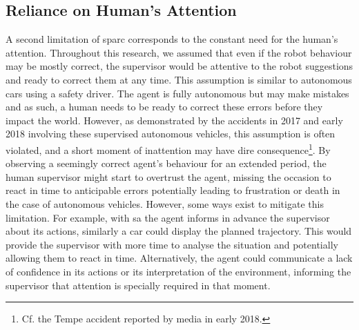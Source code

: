 \subsection{Reliance on Human's Attention}
A second limitation of \gls{sparc} corresponds to the constant need for the human's attention. Throughout this research, we assumed that even if the robot behaviour may be mostly correct, the supervisor would be attentive to the robot suggestions and ready to correct them at any time. This assumption is similar to autonomous cars using a safety driver. The agent is fully autonomous but may make mistakes and as such, a human needs to be ready to correct these errors before they impact the world. However, as demonstrated by the accidents in 2017 and early 2018 involving these supervised autonomous vehicles, this assumption is often violated, and a short moment of inattention may have dire consequence\footnote{Cf. the Tempe accident reported by media in early 2018.}. By observing a seemingly correct agent's behaviour for an extended period, the human supervisor might start to overtrust the agent, missing the occasion to react in time to anticipable errors potentially leading to frustration or death in the case of autonomous vehicles. However, some ways exist to mitigate this limitation. For example, with \gls{sa} the agent informs in advance the supervisor about its actions, similarly a car could display the planned trajectory. This would provide the supervisor with more time to analyse the situation and potentially allowing them to react in time. Alternatively, the agent could communicate a lack of confidence in its actions or its interpretation of the environment, informing the supervisor that attention is specially required in that moment.

